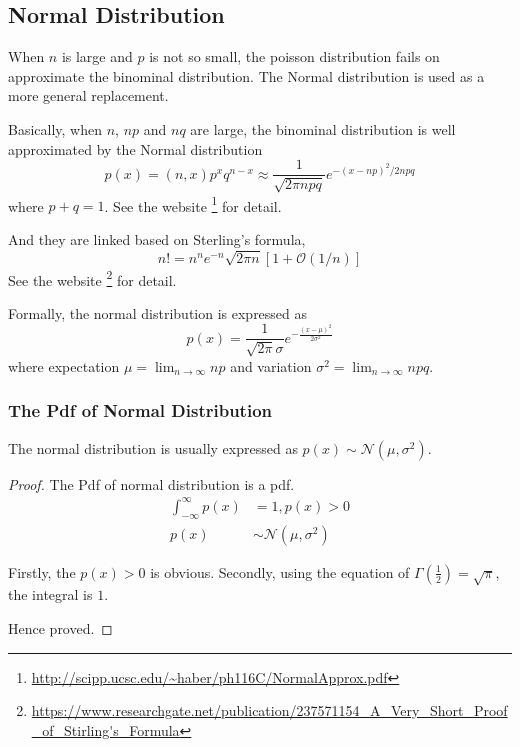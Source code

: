 \subsection{Normal Distribution}
When $n$ is large and $p$ is not so small, the poisson distribution fails on approximate the binominal distribution.
The Normal distribution is used as a more general replacement.

Basically, when $n$, $np$ and $nq$ are large, the binominal distribution is well approximated by the Normal distribution
\begin{equation*}
    p(x) = (n, x) p^x q^{n-x} \approx
    \frac{1}{\sqrt{2 \pi n p q}}
    e^{-(x-np)^2/2npq}
\end{equation*}
where $p+q=1$.
See the website \footnote{\url{http://scipp.ucsc.edu/~haber/ph116C/NormalApprox.pdf}} for detail.

And they are linked based on Sterling's formula,
\begin{equation}
    \label{Equation: Sterling's formula}
    n! = n^n e^{-n} \sqrt{2 \pi n} [1 + \mathcal{O}(1/n)]
\end{equation}
See the website \footnote{\url{https://www.researchgate.net/publication/237571154_A_Very_Short_Proof_of_Stirling's_Formula}} for detail.

Formally, the normal distribution is expressed as
\begin{equation}
    \label{Equation: Pdf of Normal distribution}
    p(x) = \frac{1}{\sqrt{2 \pi} \sigma} e^{-\frac{(x-\mu)^2}{2 \sigma^2}}
\end{equation}
where expectation $\mu = \lim_{n \rightarrow \infty} np$ and variation $\sigma^2 = \lim_{n \rightarrow \infty} npq$.

\subsubsection{The Pdf of Normal Distribution}
The normal distribution is usually expressed as $p(x) \sim \mathcal{N}(\mu, \sigma^2)$.

\begin{proof}
    The Pdf of normal distribution is a pdf.
    \begin{align*}
        \int_{-\infty}^{\infty} p(x) & = 1, p(x) > 0                   \\
        p(x)                         & \sim \mathcal{N}(\mu, \sigma^2)
    \end{align*}

    Firstly, the $p(x) > 0$ is obvious.
    Secondly, using the equation of $\Gamma(\frac{1}{2}) = \sqrt{\pi}$,
    the integral is $1$.

    Hence proved.
\end{proof}

